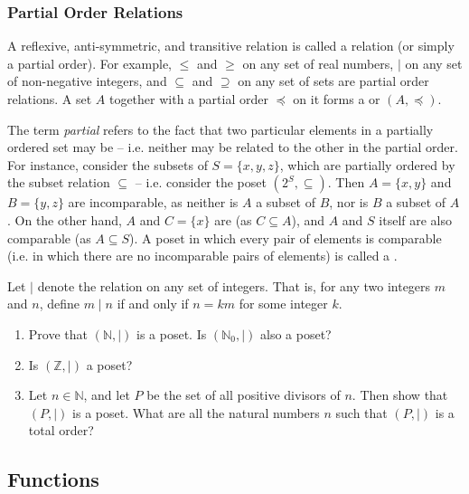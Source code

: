 \subsubsection{Partial Order Relations}

A reflexive, anti-symmetric, and transitive relation is called a  relation (or simply a partial order). For example, $\le$ and $\ge$ on any set of real numbers, $\mid$ on any set of non-negative integers, and $\subseteq$ and $\supseteq$ on any set of sets are partial order relations. A set $A$ together with a partial order $\preccurlyeq$ on it forms a  or  $(A, \preccurlyeq)$.

\begin{Note*}
The term \emph{partial} refers to the fact that two particular elements in a partially ordered set may be  -- i.e. neither may be related to the other in the partial order. For instance, consider the subsets of $S = \{x, y, z\}$, which are partially ordered by the subset relation $\subseteq$ -- i.e. consider the poset $(2^S, \subseteq)$. Then $A = \{x, y\}$ and $B =\{y, z\}$ are incomparable, as neither is $A$ a subset of $B$, nor is $B$ a subset of $A$. On the other hand, $A$ and $C = \{x\}$ are  (as $C \subseteq A$), and $A$ and $S$ itself are also comparable (as $A \subseteq S$). A poset in which every pair of elements is comparable (i.e. in which there are no incomparable pairs of elements) is called a .
\end{Note*}

\begin{Exercise}\label{exer:DividesRel}
Let $\mid$ denote the  relation on any set of integers. That is, for any two integers $m$ and $n$, define $m \mid n$ if and only if $n = km$ for some integer $k$.
\begin{enumerate}
\item Prove that $(\mathbb N, \mid)$ is a poset. Is $(\mathbb N_0, \mid)$ also a poset?
\item Is $(\mathbb Z, \mid)$ a poset?
\item Let $n \in \mathbb N$, and let $P$ be the set of all positive divisors of $n$. Then show that $(P, \mid)$ is a poset. What are all the natural numbers $n$ such that $(P, \mid)$ is a total order?
\end{enumerate}
\end{Exercise}

\subsection{Functions}\label{subsec:Functions}


